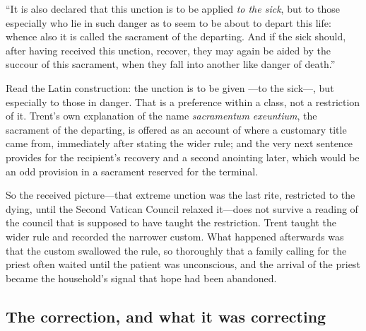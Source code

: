 ``It is also declared that this unction is to be applied \emph{to the sick}, but to those especially who lie in such danger as to seem to be about to depart this life: whence also it is called the sacrament of the departing. And if the sick should, after having received this unction, recover, they may again be aided by the succour of this sacrament, when they fall into another like danger of death.''

Read the Latin construction: the unction is to be given ---to the sick---, but especially to those in danger. That is a preference within a class, not a restriction of it. Trent's own explanation of the name \emph{sacramentum exeuntium}, the sacrament of the departing, is offered as an account of where a customary title came from, immediately after stating the wider rule; and the very next sentence provides for the recipient's recovery and a second anointing later, which would be an odd provision in a sacrament reserved for the terminal.

So the received picture---that extreme unction was the last rite, restricted to the dying, until the Second Vatican Council relaxed it---does not survive a reading of the council that is supposed to have taught the restriction. Trent taught the wider rule and recorded the narrower custom. What happened afterwards was that the custom swallowed the rule, so thoroughly that a family calling for the priest often waited until the patient was unconscious, and the arrival of the priest became the household's signal that hope had been abandoned.

\subsection{The correction, and what it was correcting}

